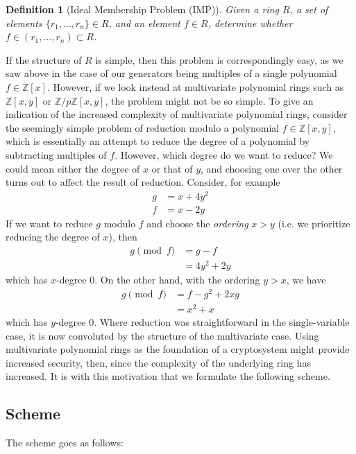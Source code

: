 \documentclass[11pt]{report}
\newtheorem{definition}{Definition}
\newcommand{\Zx}{\mathbb{Z}[x]}
\newcommand{\Zxy}{\mathbb{Z}[x,y]}
\newcommand{\Zpxy}{\mathbb{Z}/p\mathbb{Z}[x,y]}
\begin{document}
\begin{definition}[Ideal Membership Problem (IMP)]
Given a ring $R$, a set of elements $\{r_1,\dots,r_n\}\in R$, and an element $f\in R$, determine whether $f\in (r_1,\dots,r_n) \subset R$.
\end{definition}

If the structure of $R$ is simple, then this problem is correspondingly easy, as we saw above in the case of our generators being multiples of a single polynomial $f\in \Zx$. However, if we look instead at multivariate polynomial rings such as $\Zxy$ or $\Zpxy$, the problem might not be so simple. To give an indication of the increased complexity of multivariate polynomial rings, consider the seemingly simple problem of reduction modulo a polynomial $f\in \Zxy$, which is essentially an attempt to reduce the degree of a polynomial by subtracting multiples of $f$. However, which degree do we want to reduce? We could mean either the degree of $x$ or that of $y$, and choosing one over the other turns out to affect the result of reduction. Consider, for example
\begin{align*}
g &= x+4y^2\\
f &= x-2y
\end{align*}
If we want to reduce $g$ modulo $f$ and choose the \emph{ordering} $x>y$ (i.e. we prioritize reducing the degree of $x$), then
\begin{align*}
g\pmod{f} &= g-f\\
&= 4y^2+2y
\end{align*}
which has $x$-degree $0$. On the other hand, with the ordering $y>x$, we have
\begin{align*}
g\pmod{f} &= f-g^2+2xg\\
&= x^2+x
\end{align*}
which has $y$-degree $0$. Where reduction was straightforward in the single-variable case, it is now convoluted by the structure of the multivariate case. Using multivariate polynomial rings as the foundation of a cryptosystem might provide increased security, then, since the complexity of the underlying ring has increased. It is with this motivation that we formulate the following scheme.

\subsection{Scheme}
\label{sec:mv_scheme}

The scheme goes as follows:
\end{document}
